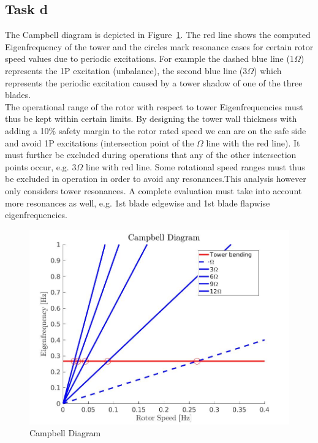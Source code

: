 \documentclass[10pt]{article}
\begin{document}
\subsection{Task d}
The Campbell diagram is depicted in Figure~\ref{fig:campbell}. The red line shows the computed Eigenfrequency of the tower and the circles mark resonance cases for certain rotor speed values due to periodic excitations. For example the dashed blue line ($1\Omega$) represents the 1P excitation (unbalance), the second blue line ($3\Omega$) which represents the periodic excitation caused by a tower shadow of one of the three blades.\\

The operational range of the rotor with respect to tower Eigenfrequencies must thus be kept within certain limits. By designing the tower wall thickness with adding a 10\% safety margin to the rotor rated speed we can are on the safe side and avoid 1P excitations (intersection point of the $\Omega$ line with the red line). It must further be excluded during operations that any of the other intersection points occur, e.g. $3\Omega$ line with red line. Some rotational speed ranges must thus be excluded in operation in order to avoid any resonances.This analysis however only considers tower resonances. A complete evaluation must take into account more resonances as well, e.g. 1st blade edgewise and 1st blade flapwise eigenfrequencies. \\

\begin{figure}[H]
\centering
\includegraphics[width=1\linewidth]{../CIP_4/figures/campbell.jpg}
\caption{Campbell Diagram}
\label{fig:campbell}
\end{figure} 
\end{document}
